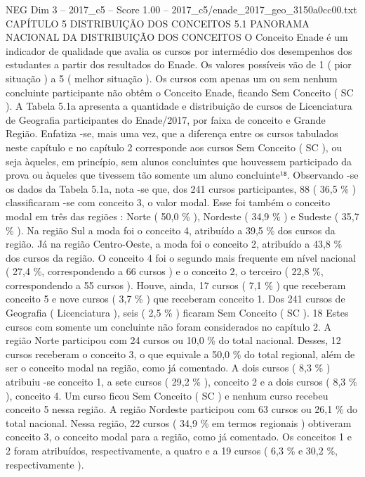 \begin{textsample}{NEG Dim 3 – 2017\_c5 – Score 1.00 – 2017\_c5/enade\_2017\_geo\_3150a0cc00.txt}  \label{ex:f3_neg_062}
CAPÍTULO 5 DISTRIBUIÇÃO DOS CONCEITOS 5.1 PANORAMA NACIONAL DA DISTRIBUIÇÃO DOS CONCEITOS O Conceito Enade é um indicador de qualidade que avalia os cursos por intermédio dos desempenhos dos estudantes a partir dos resultados do Enade.
Os valores possíveis vão de 1 ( pior situação ) a 5 ( melhor situação ).
Os cursos com apenas um ou sem nenhum concluinte participante não obtêm o Conceito Enade, ficando Sem Conceito ( SC ).
A Tabela 5.1a apresenta a quantidade e distribuição de cursos de Licenciatura de Geografia participantes do Enade/2017, por faixa de conceito e Grande Região.
Enfatiza -se, mais uma vez, que a diferença entre os cursos tabulados neste capítulo e no capítulo 2 corresponde aos cursos Sem Conceito ( SC ), ou seja àqueles, em princípio, sem alunos concluintes que houvessem participado da prova ou àqueles que tivessem tão somente um aluno concluinte¹⁸.
Observando -se os dados da Tabela 5.1a, nota -se que, dos 241 cursos participantes, 88 ( 36,5 \% ) classificaram -se com conceito 3, o valor modal.
Esse foi também o conceito modal em três das regiões : Norte ( 50,0 \% ), Nordeste ( 34,9 \% ) e Sudeste ( 35,7 \% ).
Na região Sul a moda foi o conceito 4, atribuído a 39,5 \% dos cursos da região.
Já na região Centro-Oeste, a moda foi o conceito 2, atribuído a 43,8 \% dos cursos da região.
O conceito 4 foi o segundo mais frequente em nível nacional ( 27,4 \%, correspondendo a 66 cursos ) e o conceito 2, o terceiro ( 22,8 \%, correspondendo a 55 cursos ).
Houve, ainda, 17 cursos ( 7,1 \% ) que receberam conceito 5 e nove cursos ( 3,7 \% ) que receberam conceito 1.
Dos 241 cursos de Geografia ( Licenciatura ), seis ( 2,5 \% ) ficaram Sem Conceito ( SC ). 18 Estes cursos com somente um concluinte não foram considerados no capítulo 2.
A região Norte participou com 24 cursos ou 10,0 \% do total nacional.
Desses, 12 cursos receberam o conceito 3, o que equivale a 50,0 \% do total regional, além de ser o conceito modal na região, como já comentado.
A dois cursos ( 8,3 \% ) atribuiu -se conceito 1, a sete cursos ( 29,2 \% ), conceito 2 e a dois cursos ( 8,3 \% ), conceito 4.
Um curso ficou Sem Conceito ( SC ) e nenhum curso recebeu conceito 5 nessa região.
A região Nordeste participou com 63 cursos ou 26,1 \% do total nacional.
Nessa região, 22 cursos ( 34,9 \% em termos regionais ) obtiveram conceito 3, o conceito modal para a região, como já comentado.
Os conceitos 1 e 2 foram atribuídos, respectivamente, a quatro e a 19 cursos ( 6,3 \% e 30,2 \%, respectivamente ).

\end{textsample}
